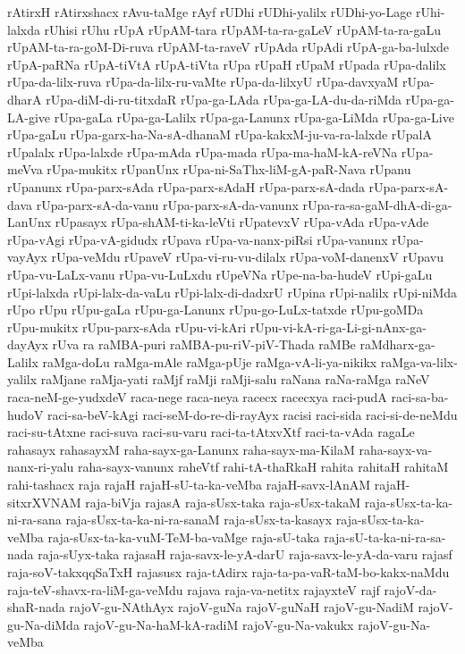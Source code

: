 {rAtirxH
rAtirxshacx
rAvu-taMge
rAyf
rUDhi
rUDhi-yalilx
rUDhi-yo-Lage
rUhi-lalxda
rUhisi
rUhu
rUpA
rUpAM-tara
rUpAM-ta-ra-gaLeV
rUpAM-ta-ra-gaLu
rUpAM-ta-ra-goM-Di-ruva
rUpAM-ta-raveV
rUpAda
rUpAdi
rUpA-ga-ba-lulxde
rUpA-paRNa
rUpA-tiVtA
rUpA-tiVta
rUpa
rUpaH
rUpaM
rUpada
rUpa-dalilx
rUpa-da-lilx-ruva
rUpa-da-lilx-ru-vaMte
rUpa-da-lilxyU
rUpa-davxyaM
rUpa-dharA
rUpa-diM-di-ru-titxdaR
rUpa-ga-LAda
rUpa-ga-LA-du-da-riMda
rUpa-ga-LA-give
rUpa-gaLa
rUpa-ga-Lalilx
rUpa-ga-Lanunx
rUpa-ga-LiMda
rUpa-ga-Live
rUpa-gaLu
rUpa-garx-ha-Na-sA-dhanaM
rUpa-kakxM-ju-va-ra-lalxde
rUpalA
rUpalalx
rUpa-lalxde
rUpa-mAda
rUpa-mada
rUpa-ma-haM-kA-reVNa
rUpa-meVva
rUpa-mukitx
rUpanUnx
rUpa-ni-SaThx-liM-gA-paR-Nava
rUpanu
rUpanunx
rUpa-parx-sAda
rUpa-parx-sAdaH
rUpa-parx-sA-dada
rUpa-parx-sA-dava
rUpa-parx-sA-da-vanu
rUpa-parx-sA-da-vanunx
rUpa-ra-sa-gaM-dhA-di-ga-LanUnx
rUpasayx
rUpa-shAM-ti-ka-leVti
rUpatevxV
rUpa-vAda
rUpa-vAde
rUpa-vAgi
rUpa-vA-gidudx
rUpava
rUpa-va-nanx-piRsi
rUpa-vanunx
rUpa-vayAyx
rUpa-veMdu
rUpaveV
rUpa-vi-ru-vu-dilalx
rUpa-voM-danenxV
rUpavu
rUpa-vu-LaLx-vanu
rUpa-vu-LuLxdu
rUpeVNa
rUpe-na-ba-hudeV
rUpi-gaLu
rUpi-lalxda
rUpi-lalx-da-vaLu
rUpi-lalx-di-dadxrU
rUpina
rUpi-nalilx
rUpi-niMda
rUpo
rUpu
rUpu-gaLa
rUpu-ga-Lanunx
rUpu-go-LuLx-tatxde
rUpu-goMDa
rUpu-mukitx
rUpu-parx-sAda
rUpu-vi-kAri
rUpu-vi-kA-ri-ga-Li-gi-nAnx-ga-dayAyx
rUva
ra
raMBA-puri
raMBA-pu-riV-piV-Thada
raMBe
raMdharx-ga-Lalilx
raMga-doLu
raMga-mAle
raMga-pUje
raMga-vA-li-ya-nikikx
raMga-va-lilx-yalilx
raMjane
raMja-yati
raMjf
raMji
raMji-salu
raNana
raNa-raMga
raNeV
raca-neM-ge-yudxdeV
raca-nege
raca-neya
racecx
racecxya
raci-pudA
raci-sa-ba-hudoV
raci-sa-beV-kAgi
raci-seM-do-re-di-rayAyx
racisi
raci-sida
raci-si-de-neMdu
raci-su-tAtxne
raci-suva
raci-su-varu
raci-ta-tAtxvXtf
raci-ta-vAda
ragaLe
rahasayx
rahasayxM
raha-sayx-ga-Lanunx
raha-sayx-ma-KilaM
raha-sayx-va-nanx-ri-yalu
raha-sayx-vanunx
raheVtf
rahi-tA-thaRkaH
rahita
rahitaH
rahitaM
rahi-tashacx
raja
rajaH
rajaH-sU-ta-ka-veMba
rajaH-savx-lAnAM
rajaH-sitxrXVNAM
raja-biVja
rajasA
raja-sUsx-taka
raja-sUsx-takaM
raja-sUsx-ta-ka-ni-ra-sana
raja-sUsx-ta-ka-ni-ra-sanaM
raja-sUsx-ta-kasayx
raja-sUsx-ta-ka-veMba
raja-sUsx-ta-ka-vuM-TeM-ba-vaMge
raja-sU-taka
raja-sU-ta-ka-ni-ra-sa-nada
raja-sUyx-taka
rajasaH
raja-savx-le-yA-darU
raja-savx-le-yA-da-varu
rajasf
raja-soV-takxqqSaTxH
rajasusx
raja-tAdirx
raja-ta-pa-vaR-taM-bo-kakx-naMdu
raja-teV-shavx-ra-liM-ga-veMdu
rajava
raja-va-netitx
rajayxteV
rajf
rajoV-da-shaR-nada
rajoV-gu-NAthAyx
rajoV-guNa
rajoV-guNaH
rajoV-gu-NadiM
rajoV-gu-Na-diMda
rajoV-gu-Na-haM-kA-radiM
rajoV-gu-Na-vakukx
rajoV-gu-Na-veMba
}
